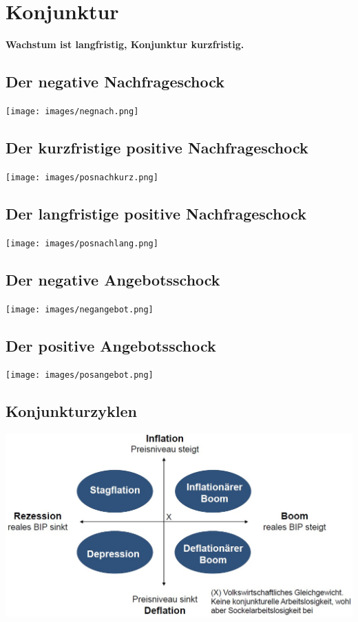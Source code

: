 \section{Konjunktur}
\textbf{Wachstum ist langfristig, Konjunktur kurzfristig.}

\begin{multicols}{2}
\subsection{Der negative Nachfrageschock}
\texttt{[image: images/negnach.png]}
\vfill\null
\columnbreak
\subsection{Der kurzfristige positive Nachfrageschock}
\texttt{[image: images/posnachkurz.png]}
\end{multicols}

\begin{multicols}{2}
\subsection{Der langfristige positive Nachfrageschock}
\texttt{[image: images/posnachlang.png]}
\columnbreak
\subsection{Der negative Angebotsschock}
\texttt{[image: images/negangebot.png]}
\end{multicols}

\begin{multicols}{2}
\subsection{Der positive Angebotsschock}
\texttt{[image: images/posangebot.png]}
\columnbreak
\subsection{Konjunkturzyklen}
\includegraphics[width=\linewidth]{images/konjunkturzyklen.jpg}
\end{multicols}

